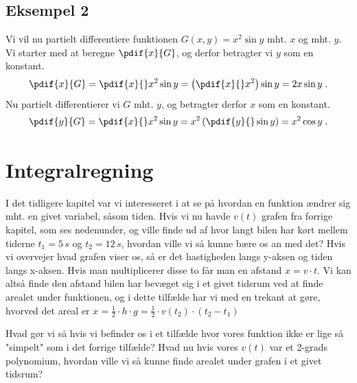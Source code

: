 \subsection{Eksempel 2}
Vi vil nu partielt differentiere funktionen $G(x,y) = x^2 \sin y$
mht. $x$ og mht. $y$. Vi starter med at beregne $\pdif{x}{G}$, og
derfor betragter vi $y$ som en konstant.
\[
\pdif{x}{G} = \pdif{x}{} x^2 \sin y
= \left(\pdif{x}{} x^2 \right) \sin y = 2 x \sin y \; .
\]
Nu partielt differentierer vi $G$ mht. $y$, og betragter derfor $x$ som en
konstant.
\[
\pdif{y}{G} = \pdif{x}{} x^2 \sin y
= x^2 \left(\pdif{y}{} \sin y \right) = x^2 \cos y \; .
\]





\section{Integralregning}
I det tidligere kapitel var vi interesseret i at se på hvordan en
funktion ændrer sig mht. en givet variabel, såsom tiden. Hvis vi
nu havde $v(t)$ grafen fra forrige kapitel, som ses nedenunder, og
ville finde ud af hvor langt bilen har kørt mellem tiderne
$t_1=5\, s$ og $t_2 = 12\,s$, hvordan ville vi så kunne bære os an
med det? Hvis vi overvejer hvad grafen viser os, så er det hastigheden
langs y-aksen og tiden langs x-aksen. Hvis man multiplicerer disse to
får man en afstand $x = v\cdot t$. Vi kan altså finde den afstand bilen
har bevæget sig i et givet tidsrum ved at finde arealet under funktionen,
og i dette tilfælde har vi med en trekant at gøre, hvorved det areal er
$x=\frac{1}{2}\cdot h \cdot g = \frac{1}{2} \cdot v(t_2) \cdot (t_2 - t_1)$

\begin{center}
\end{center}
Hvad gør vi så hvis vi befinder os i et tilfælde hvor vores funktion ikke er
lige så "simpelt" som i det forrige tilfælde? Hvad nu hvis vores $v(t)$ var et
2-grads polynomium, hvordan ville vi så kunne finde arealet under grafen i et
givet tidsrum?

